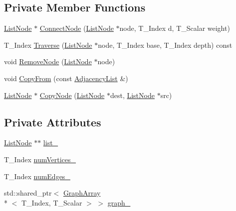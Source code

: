 \subsection*{Private Member Functions}
\begin{DoxyCompactItemize}
\item 
\hyperlink{struct_undirected_weighted_graph_1_1_adjacency_list_1_1_list_node}{List\+Node} $\ast$ \hyperlink{class_undirected_weighted_graph_1_1_adjacency_list_a7b606dad8cbec354470404732aebf5e8}{Connect\+Node} (\hyperlink{struct_undirected_weighted_graph_1_1_adjacency_list_1_1_list_node}{List\+Node} $\ast$node, T\+\_\+\+Index d, T\+\_\+\+Scalar weight)
\item 
T\+\_\+\+Index \hyperlink{class_undirected_weighted_graph_1_1_adjacency_list_ae4dbfea7c41e1b33b5da2a60553b07b1}{Traverse} (\hyperlink{struct_undirected_weighted_graph_1_1_adjacency_list_1_1_list_node}{List\+Node} $\ast$node, T\+\_\+\+Index base, T\+\_\+\+Index depth) const 
\item 
void \hyperlink{class_undirected_weighted_graph_1_1_adjacency_list_a535a99e8c65ad9aa76f4b47c93b1a802}{Remove\+Node} (\hyperlink{struct_undirected_weighted_graph_1_1_adjacency_list_1_1_list_node}{List\+Node} $\ast$node)
\item 
void \hyperlink{class_undirected_weighted_graph_1_1_adjacency_list_a2af1438d6aeb43e21a7ca8966cec2c8a}{Copy\+From} (const \hyperlink{class_undirected_weighted_graph_1_1_adjacency_list}{Adjacency\+List} \&)
\item 
\hyperlink{struct_undirected_weighted_graph_1_1_adjacency_list_1_1_list_node}{List\+Node} $\ast$ \hyperlink{class_undirected_weighted_graph_1_1_adjacency_list_a121be048d41052d84c3805789103283c}{Copy\+Node} (\hyperlink{struct_undirected_weighted_graph_1_1_adjacency_list_1_1_list_node}{List\+Node} $\ast$dest, \hyperlink{struct_undirected_weighted_graph_1_1_adjacency_list_1_1_list_node}{List\+Node} $\ast$src)
\end{DoxyCompactItemize}
\subsection*{Private Attributes}
\begin{DoxyCompactItemize}
\item 
\hyperlink{struct_undirected_weighted_graph_1_1_adjacency_list_1_1_list_node}{List\+Node} $\ast$$\ast$ \hyperlink{class_undirected_weighted_graph_1_1_adjacency_list_a6e46162121cb122f3ba430c7a2528cac}{list\+\_\+}
\item 
T\+\_\+\+Index \hyperlink{class_undirected_weighted_graph_1_1_adjacency_list_a32595c1491afb41034135ceb07eadb4d}{num\+Vertices\+\_\+}
\item 
T\+\_\+\+Index \hyperlink{class_undirected_weighted_graph_1_1_adjacency_list_a383bf107a02d24417f668c9cb175959f}{num\+Edges\+\_\+}
\item 
std\+::shared\+\_\+ptr$<$ \hyperlink{struct_undirected_weighted_graph_1_1_graph_array}{Graph\+Array}\\*
$<$ T\+\_\+\+Index, T\+\_\+\+Scalar $>$ $>$ \hyperlink{class_undirected_weighted_graph_1_1_adjacency_list_a9fa1388a2f0ec3c1428da65604290bdf}{graph\+\_\+}
\end{DoxyCompactItemize}


